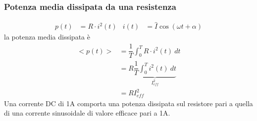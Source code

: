 \documentclass{article}
\begin{document}
\subsubsection{Potenza media dissipata da una resistenza}
\begin{align*}
    p(t) &= R\cdot i^2(t) & i(t) &= \hat I \cos (\omega t + \alpha)
\end{align*}
la potenza media dissipata è
\begin{align*}
    <p(t)> &= \dfrac{1}{T} \int_0^T R \cdot i^2(t) \ dt\\
    &=R\underbrace{\dfrac{1}{T} \int_0^T i^2(t) \ dt}_{I_{eff}^2}\\
    &=RI_{eff}^2
\end{align*}
Una corrente DC di 1A comporta una potenza dissipata sul resistore pari a quella di una corrente sinusoidale di valore efficace pari a 1A.
\end{document}
